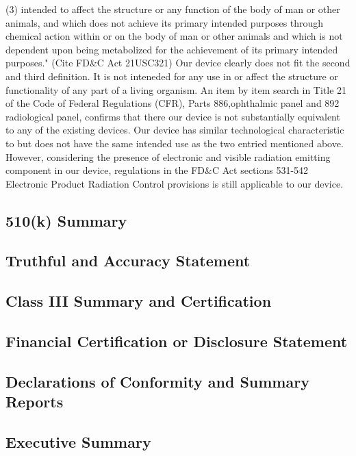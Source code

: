 \documentclass{article}
\begin{document}
(3) intended to affect the structure or any function of the body of man or other animals, and which does not achieve its primary intended purposes through chemical action within or on the body of man or other animals and which is not dependent upon being metabolized for the achievement of its primary intended purposes." (Cite FD&C Act 21USC321)
Our device clearly does not fit the second and third definition. It is not inteneded for any use in or affect the structure or functionality of any part of a living organism. An item by item search in Title 21 of the Code of Federal Regulations (CFR), Parts 886,ophthalmic panel and 892 radiological panel, confirms that there our device is not substantially equivalent to any of the existing devices. Our device has similar technological characteristic to but does not have the same intended use as the two entried mentioned above.
However, considering the presence of electronic and visible radiation emitting component in our device, regulations in the FD&C Act sections 531-542 Electronic Product Radiation Control provisions is still applicable to our device.



\setcounter{subsection}{0}


\subsection{510(k) Summary}
\subsection{Truthful and Accuracy Statement}
\subsection{Class III Summary and Certification}
\subsection{Financial Certification or Disclosure Statement}
\subsection{Declarations of Conformity and Summary Reports}
\subsection{Executive Summary}
\end{document}
